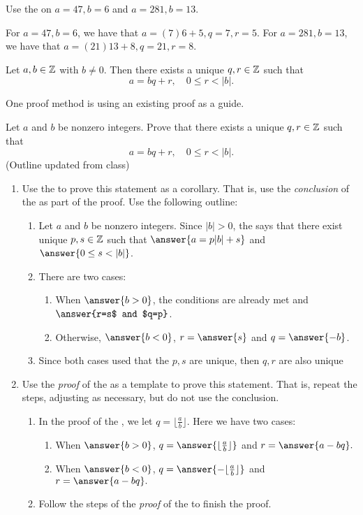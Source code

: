 \documentclass{ximera}
\begin{document}
\begin{br}
 Use the  on $a=47, b=6$ and $a=281, b=13$.
\end{br}
\begin{solution}
For $a=47, b=6$, we have that $a=(7)6+5, q=7, r=5$.
For $a=281, b=13$, we have that $a=(21)13+8, q=21, r=8$.
\end{solution}

\begin{corollary}
 Let $a,b\in\mathbb Z$ with $b\neq0$. Then there exists a unique $q,r\in\mathbb Z$ such that \[a=bq+r, \quad 0\leq r <|b|.\]
\end{corollary}
One proof method is using an existing proof as a guide.

\begin{br}  Let $a$ and $b$ be nonzero integers. Prove that there exists a unique $q,r\in\mathbb Z$ such that 
  \[a=bq+r, \quad 0\leq r <|b|.\]
(Outline updated from class)
  \begin{enumerate}
    	\item Use the  to prove this statement as a corollary. That is, use the \emph{conclusion} of the  as part of the proof.  Use the following outline:
    	\begin{enumerate}
		\item  Let $a$ and $b$ be nonzero integers. Since $|b|>0$, the  says that there exist unique $p,s\in\mathbb Z$ such that $\answer{a=p|b|+s}$ and $\answer{0\leq s<|b|}$.
      		\item There are two cases:
      		\begin{enumerate}
        			\item When $\answer{b>0}$, the conditions are already met and $\answer{r=s$ and $q=p}$.
        			\item Otherwise, $\answer{b<0}$, $r=\answer{s}$ and $q=\answer{-b}$.
      		\end{enumerate}
      		\item Since both cases used that the $p,s$ are unique, then $q,r$ are also unique
	\end{enumerate}
    	\item Use the \emph{proof} of the  as a template to prove this statement. That is, repeat the steps, adjusting as necessary, but do not use the conclusion.
    	\begin{enumerate}
    		\item In the proof of the , we let $q=\lfloor\frac{a}{b}\rfloor$. Here we have two cases:
    		\begin{enumerate}
      			\item When $\answer{b>0}$, $q=\answer{\lfloor\frac{a}{b}\rfloor}$ and $r=\answer{a-bq}.$
      			\item When $\answer{b<0}$, $q=\answer{-\lfloor\frac{a}{b}\rfloor}$ and $r=\answer{a-bq}.$   
		\end{enumerate}
    		\item Follow the steps of the \emph{proof} of the  to finish the proof.
    	\end{enumerate}


\end{enumerate}
\end{br}
\end{document}
